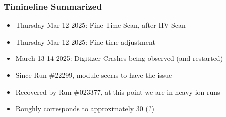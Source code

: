 \begin{frame}
    \frametitle{Timineline Summarized}

    \begin{itemize}
        \item Thursday Mar 12 2025: Fine Time Scan, after HV Scan
        \item Thursday Mar 12 2025: Fine time adjustment
        \item March 13-14 2025: Digitizer Crashes being observed (and restarted)
        \item Since Run \#{22299}, module seems to have the issue
        \item Recovered by Run \#{023377}, at this point we are in heavy-ion runs
        \item Roughly corresponds to approximately 30 \ifb (?)
    \end{itemize}

\end{frame}

